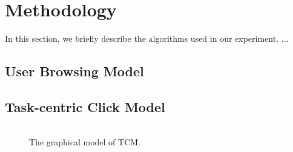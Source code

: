 \section{Methodology}
\label{sec:methodology}

In this section, we briefly describe the algorithms used in our experiment.
...

\subsection{User Browsing Model}

\subsection{Task-centric Click Model}
\begin{figure}[ht]
  \begin{center}
    \begin{tabular}{c}
      
    \end{tabular}
  \end{center}
  \caption{The graphical model of TCM.}
\end{figure}
